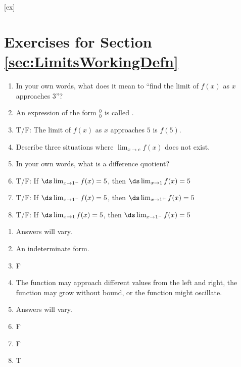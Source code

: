 [ex]
\section*{Exercises for Section \ref{sec:LimitsWorkingDefn}}

\begin{multicols}{2}

\begin{enumialphparenastyle}

\begin{ex}
\begin{enumerate}
\item {In your own words, what does it mean to ``find the limit of $f(x)$ as $x$ approaches 3''?}

\item {An expression of the form $\frac00$ is called \underline{\hskip 15pt}.}

\item {T/F: The limit of $f(x)$ as $x$ approaches $5$ is $f(5)$.}

\item {Describe three situations where $\displaystyle \lim_{x\to c}f(x)$ does not exist.}

\item {In your own words, what is a difference quotient?}

\item {T/F: If $\ds \lim_{x\to 1^-} f(x) = 5$, then $\ds \lim_{x\to 1} f(x) = 5$}

\item {T/F: If $\ds \lim_{x\to 1^-} f(x) = 5$, then $\ds \lim_{x\to 1^+} f(x) = 5$}

\item {T/F: If $\ds \lim_{x\to 1} f(x) = 5$, then $\ds \lim_{x\to 1^-} f(x) = 5$}

\end{enumerate}

\begin{sol}
\begin{enumerate}
\item {Answers will vary.}
\item {An indeterminate form.}
\item {F}
\item {The function may approach different values from the left and right, the function may grow without bound, or the function might oscillate.}
\item {Answers will vary.}
\item {F}
\item {F}
\item {T}
\end{enumerate}
\end{sol}


\end{ex}
\end{enumialphparenastyle}
\end{multicols}
